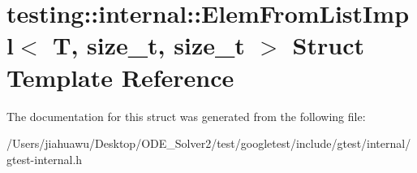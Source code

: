 \hypertarget{structtesting_1_1internal_1_1_elem_from_list_impl}{}\section{testing\+:\+:internal\+:\+:Elem\+From\+List\+Impl$<$ T, size\+\_\+t, size\+\_\+t $>$ Struct Template Reference}
\label{structtesting_1_1internal_1_1_elem_from_list_impl}


The documentation for this struct was generated from the following file\+:\begin{DoxyCompactItemize}
\item 
/\+Users/jiahuawu/\+Desktop/\+O\+D\+E\+\_\+\+Solver2/test/googletest/include/gtest/internal/gtest-\/internal.\+h\end{DoxyCompactItemize}

